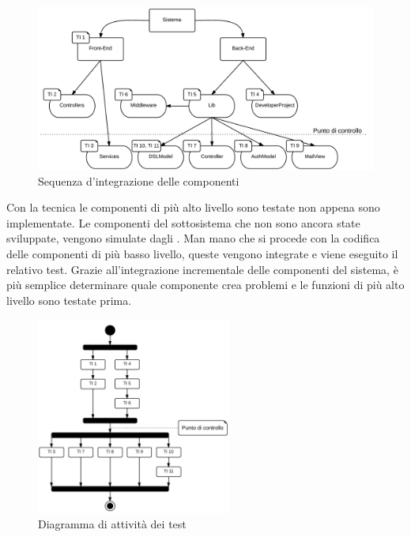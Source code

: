 	\begin{figure}[H]
	\centering \includegraphics[width=1\textwidth]{sequenza-di-integrazione.png}
	\caption{Sequenza d'integrazione delle componenti}
	\label{fig:sequenza-di-integrazione}
	\end{figure}

	Con la tecnica  le componenti di più alto livello sono testate non appena sono implementate. Le componenti del sottosistema che non sono ancora state sviluppate, vengono simulate dagli . Man mano che si procede con la codifica delle componenti di più basso livello, queste vengono integrate e viene eseguito il relativo test. Grazie all'integrazione incrementale delle componenti del sistema, è più semplice determinare quale componente crea problemi e le funzioni di più alto livello sono testate prima.

	\begin{figure}[H]
	\centering \includegraphics[width=0.57\textwidth]{sequenza-dei-test.png}
	\caption{Diagramma di attività dei test}
	\label{fig:sequenza-dei-test}
	\end{figure}
	
